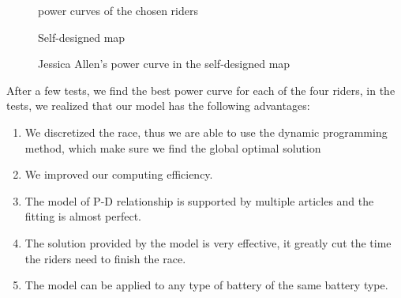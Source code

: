 \documentclass[12pt]{article}
\begin{document}
\begin{figure}[H]
    \centering

    \caption {power curves of the chosen riders}
\end{figure}

\begin{figure}[H]
    \centering
    \caption{Self-designed map}
\end{figure}
\begin{figure}
    \centering
    
    \caption{Jessica Allen's power curve in the self-designed map}
\end{figure}
After a few tests, we find the best power curve for each of the four riders, in the tests, we realized that
our model has the following advantages:
\begin{enumerate}
    \item We discretized the race, thus we are able to use the dynamic programming method, which make sure we find the global optimal solution %
    \item We improved our computing efficiency.%
    \item The model of P-D relationship is supported by multiple articles and the fitting is almost perfect.
    \item The solution provided by the model is very effective, it greatly cut the time the riders need to finish the race.
    \item The model can be applied to any type of battery of the same battery type.
\end{enumerate}
\end{document}
